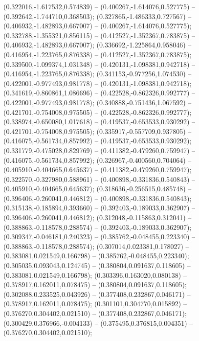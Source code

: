  (0.322016,-1.617532,0.574839) -- (0.400267,-1.614076,0.527775) -- (0.392642,-1.744710,0.368503);
 (0.327865,-1.486333,0.727567) -- (0.406932,-1.482893,0.667007) -- (0.400267,-1.614076,0.527775);
 (0.332788,-1.355321,0.856115) -- (0.412527,-1.352367,0.783875) -- (0.406932,-1.482893,0.667007);
 (0.336692,-1.225864,0.958046) -- (0.416954,-1.223765,0.876338) -- (0.412527,-1.352367,0.783875);
 (0.339500,-1.099374,1.031348) -- (0.420131,-1.098381,0.942718) -- (0.416954,-1.223765,0.876338);
 (0.341153,-0.977256,1.074530) -- (0.422001,-0.977493,0.981778) -- (0.420131,-1.098381,0.942718);
 (0.341619,-0.860861,1.086696) -- (0.422528,-0.862326,0.992777) -- (0.422001,-0.977493,0.981778);
 (0.340888,-0.751436,1.067592) -- (0.421701,-0.754008,0.975505) -- (0.422528,-0.862326,0.992777);
 (0.338974,-0.650080,1.017618) -- (0.419537,-0.653533,0.930292) -- (0.421701,-0.754008,0.975505);
 (0.335917,-0.557709,0.937805) -- (0.416075,-0.561734,0.857992) -- (0.419537,-0.653533,0.930292);
 (0.331779,-0.475028,0.829769) -- (0.411382,-0.479260,0.759947) -- (0.416075,-0.561734,0.857992);
 (0.326967,-0.400560,0.704064) -- (0.405910,-0.404665,0.645637) -- (0.411382,-0.479260,0.759947);
 (0.322570,-0.327980,0.588961) -- (0.400898,-0.331836,0.540843) -- (0.405910,-0.404665,0.645637);
 (0.318636,-0.256515,0.485748) -- (0.396406,-0.260041,0.446812) -- (0.400898,-0.331836,0.540843);
 (0.315138,-0.185894,0.393660) -- (0.392403,-0.189033,0.362907) -- (0.396406,-0.260041,0.446812);
 (0.312048,-0.115863,0.312041) -- (0.388863,-0.118578,0.288574) -- (0.392403,-0.189033,0.362907);
 (0.309347,-0.046181,0.240323) -- (0.385762,-0.048455,0.223340) -- (0.388863,-0.118578,0.288574);
 (0.307014,0.023381,0.178027) -- (0.383081,0.021549,0.166798) -- (0.385762,-0.048455,0.223340);
 (0.305035,0.093043,0.124745) -- (0.380804,0.091637,0.118605) -- (0.383081,0.021549,0.166798);
 (0.303396,0.163020,0.080138) -- (0.378917,0.162011,0.078475) -- (0.380804,0.091637,0.118605);
 (0.302088,0.233525,0.043926) -- (0.377408,0.232867,0.046171) -- (0.378917,0.162011,0.078475);
 (0.301101,0.304770,0.015892) -- (0.376270,0.304402,0.021510) -- (0.377408,0.232867,0.046171);
 (0.300429,0.376966,-0.004133) -- (0.375495,0.376815,0.004351) -- (0.376270,0.304402,0.021510);
